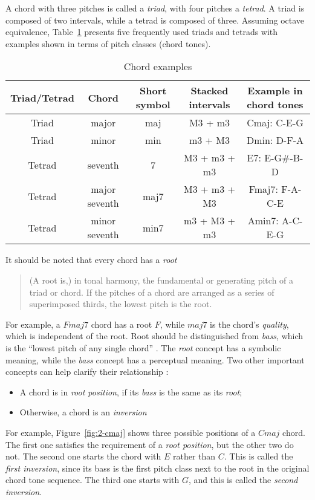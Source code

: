 A chord with three pitches is called a {\it triad}, with four pitches a {\it tetrad}. A triad is composed of two intervals, while a tetrad is composed of three. Assuming octave equivalence, Table~\ref{tab:2-chords} presents five frequently used triads and tetrads with examples shown in terms of pitch classes (chord tones).
\begin{table}[htb]
\centering
\scriptsize
\begin{tabular}{|c|c|c|c|c|} \hline
Triad/Tetrad & Chord & Short symbol & Stacked intervals & Example in chord tones \\ \hline
Triad & major & maj & M3 + m3 & Cmaj: C-E-G \\ \hline
Triad & minor & min & m3 + M3 & Dmin: D-F-A \\ \hline
Tetrad  & seventh & 7 & M3 + m3 + m3 & E7: E-G\#-B-D \\ \hline
Tetrad & major seventh & maj7 & M3 + m3 + M3 & Fmaj7: F-A-C-E \\ \hline
Tetrad & minor seventh & min7 & m3 + M3 + m3 & Amin7: A-C-E-G \\ \hline
\end{tabular}
\caption{Chord examples}
\label{tab:2-chords}
\end{table}
It should be noted that every chord has a {\it root} \cite{randel1999harvard}
\begin{quote}
(A root is,) in tonal harmony, the fundamental or generating pitch of a triad or chord. If the pitches of a chord are arranged as a series of superimposed thirds, the lowest pitch is the root.
\end{quote}
For example, a $Fmaj7$ chord has a root $F$, while $maj7$ is the chord's {\it quality}, which is independent of the root. Root should be distinguished from {\it bass}, which is the ``lowest pitch of any single chord'' \cite{randel1999harvard}. The {\it root} concept has a symbolic meaning, while the {\it bass} concept has a perceptual meaning. Two other important concepts can help clarify their relationship \cite{randel1999harvard}:
\begin{itemize}
\item A chord is in {\it root position}, if its {\it bass} is the same as its {\it root};
\item Otherwise, a chord is an {\it inversion}
\end{itemize}
For example, Figure~\ref{fig:2-cmaj} shows three possible positions of a $Cmaj$ chord. The first one satisfies the requirement of a {\it root position}, but the other two do not. The second one starts the chord with $E$ rather than $C$. This is called the {\it first inversion}, since its bass is the first pitch class next to the root in the original chord tone sequence. The third one starts with $G$, and this is called the {\it second inversion}.
